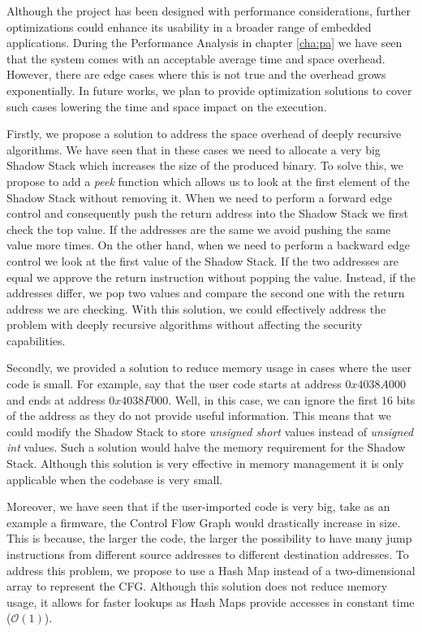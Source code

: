 Although the project has been designed with performance considerations, further
optimizations could enhance its usability in a broader range of embedded
applications. During the Performance Analysis in chapter \ref{cha:pa} we have seen
that the system comes with an acceptable average time and space overhead.
However, there are edge cases where this is not true and the overhead grows exponentially.
In future works, we plan to provide optimization solutions to cover such cases lowering
the time and space impact on the execution.

Firstly, we propose a solution to address the space overhead of deeply recursive
algorithms. We have seen that in these cases we need to allocate a very big Shadow
Stack which increases the size of the produced binary. To solve this, we propose
to add a \textit{peek} function which allows us to look at the first element of
the Shadow Stack without removing it. When we need to perform a forward edge control
and consequently push the return address into the Shadow Stack we first check the
top value. If the addresses are the same we avoid pushing the same value more
times. On the other hand, when we need to perform a backward edge control we
look at the first value of the Shadow Stack. If the two addresses are equal we approve
the return instruction without popping the value. Instead, if the addresses differ,
we pop two values and compare the second one with the return address we are
checking. With this solution, we could effectively address the problem with
deeply recursive algorithms without affecting the security capabilities.

Secondly, we provided a solution to reduce memory usage in cases where the user code
is small. For example, say that the user code starts at address $0x4038A000$ and
ends at address $0x4038F000$. Well, in this case, we can ignore the first $16$
bits of the address as they do not provide useful information. This means that we
could modify the Shadow Stack to store \textit{unsigned short} values instead of
\textit{unsigned int} values. Such a solution would halve the memory requirement
for the Shadow Stack. Although this solution is very effective in memory management
it is only applicable when the codebase is very small.

Moreover, we have seen that if the user-imported code is very big, take as an example
a firmware, the Control Flow Graph would drastically increase in size. This is because,
the larger the code, the larger the possibility to have many jump instructions from
different source addresses to different destination addresses. To address this
problem, we propose to use a Hash Map instead of a two-dimensional array to represent
the CFG. Although this solution does not reduce memory usage, it allows for faster
lookups as Hash Maps provide accesses in constant time ($\mathcal{O}(1)$).

